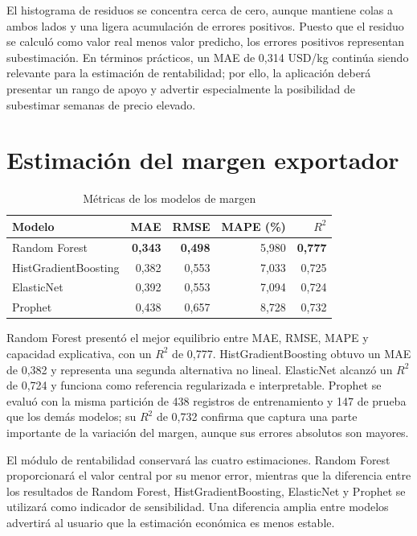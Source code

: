El histograma de residuos se concentra cerca de cero, aunque mantiene colas a ambos lados y una ligera acumulación de errores positivos. Puesto que el residuo se calculó como valor real menos valor predicho, los errores positivos representan subestimación. En términos prácticos, un MAE de 0,314 USD/kg continúa siendo relevante para la estimación de rentabilidad; por ello, la aplicación deberá presentar un rango de apoyo y advertir especialmente la posibilidad de subestimar semanas de precio elevado.

\section{Estimación del margen exportador}

\begin{table}[H]
\centering
\caption{Métricas de los modelos de margen}
\label{tab:resultados_margen}
\small
\begin{tabular}{lrrrr}
\toprule
\textbf{Modelo} & \textbf{MAE} & \textbf{RMSE} & \textbf{MAPE (\%)} & \textbf{$R^2$} \\
\midrule
Random Forest & \textbf{0,343} & \textbf{0,498} & 5,980 & \textbf{0,777} \\
HistGradientBoosting & 0,382 & 0,553 & 7,033 & 0,725 \\
ElasticNet & 0,392 & 0,553 & 7,094 & 0,724 \\
Prophet & 0,438 & 0,657 & 8,728 & 0,732 \\
\bottomrule
\end{tabular}
\end{table}

Random Forest presentó el mejor equilibrio entre MAE, RMSE, MAPE y capacidad explicativa, con un $R^2$ de 0,777. HistGradientBoosting obtuvo un MAE de 0,382 y representa una segunda alternativa no lineal. ElasticNet alcanzó un $R^2$ de 0,724 y funciona como referencia regularizada e interpretable. Prophet se evaluó con la misma partición de 438 registros de entrenamiento y 147 de prueba que los demás modelos; su $R^2$ de 0,732 confirma que captura una parte importante de la variación del margen, aunque sus errores absolutos son mayores.

El módulo de rentabilidad conservará las cuatro estimaciones. Random Forest proporcionará el valor central por su menor error, mientras que la diferencia entre los resultados de Random Forest, HistGradientBoosting, ElasticNet y Prophet se utilizará como indicador de sensibilidad. Una diferencia amplia entre modelos advertirá al usuario que la estimación económica es menos estable.

